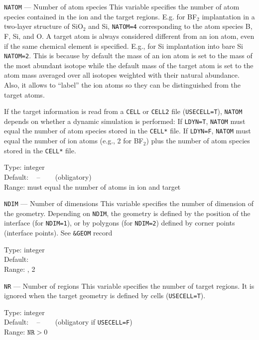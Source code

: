 \begin{keydescription}{\texttt{NATOM} --- Number of atom species}
%
  This variable specifies the number of atom species contained in the
  ion and the target regions. E.g. for BF$_2$ implantation in a
  two-layer structure of SiO$_2$ and Si, \texttt{NATOM=4} corresponding
  to the atom species B, F, Si, and O.  A target atom is always
  considered different from an ion atom, even if the same chemical
  element is specified.  E.g., for Si implantation into bare Si
  \texttt{NATOM=2}.  This is because by default the mass of an ion
  atom is set to the mass of the most abundant isotope while the
  default mass of the target atom is set to the atom mass averaged
  over all isotopes weighted with their natural abundance.  Also, it
  allows to ``label'' the ion atoms so they can be distinguished from
  the target atoms.
  
  If the target information is read from a \texttt{CELL} or \texttt{CELL2}
  file (\texttt{USECELL=T}), \texttt{NATOM} depends on whether a dynamic
  simulation is performed: If \texttt{LDYN=T}, \texttt{NATOM} must equal
  the number of atom species stored in the \texttt{CELL*} file.  If 
  \texttt{LDYN=F}, \texttt{NATOM} must equal the number of ion atoms (e.g., 2
  for BF$_2$) plus the number of atom species  stored in the \texttt{CELL*} 
  file.
%
  \begin{keytab}
    Type:    \> integer \\
    Default: \> ~ -- ~~~ (obligatory) \\
    Range:   \> must equal the number of atoms in ion and target
  \end{keytab}
\end{keydescription}

\begin{keydescription}{\texttt{NDIM} --- Number of dimensions}
%
  This variable specifies the number of dimension of the geometry.
  Depending on \texttt{NDIM}, the geometry is defined by the position of
  the interface (for \texttt{NDIM=1}), or by polygons (for
  \texttt{NDIM=2}) defined by corner points (interface points). See
  \texttt{\&GEOM} record
%
  \begin{keytab}
    Type:    \> integer \\
    Default:  \\
    Range:   , 2
  \end{keytab}
\end{keydescription}

\begin{keydescription}{\texttt{NR} --- Number of regions}
%
  This variable specifies the number of target regions. It is ignored when
  the target geometry is defined by cells (\texttt{USECELL=T}).
%
  \begin{keytab}
    Type:    \> integer \\
    Default: \> ~ -- ~~~ (obligatory if \texttt{USECELL=F}) \\
    Range:   \> $\texttt{NR} > 0$
  \end{keytab}
\end{keydescription}


